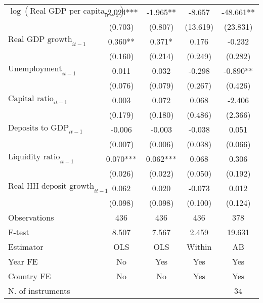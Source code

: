 \begin{longtable}{m{8cm}*{4}{c}}
$\log(\text{Real GDP per capita}_{it-1})$&      -2.024***&      -1.965** &      -8.657   &     -48.661** \\
                    &     (0.703)   &     (0.807)   &    (13.619)   &    (23.831)   \\
$\text{Real GDP growth}_{it-1}$&       0.360** &       0.371*  &       0.176   &      -0.232   \\
                    &     (0.160)   &     (0.214)   &     (0.249)   &     (0.282)   \\
$\text{Unemployment}_{it-1}$&       0.011   &       0.032   &      -0.298   &      -0.890** \\
                    &     (0.076)   &     (0.079)   &     (0.267)   &     (0.426)   \\
$\text{Capital ratio}_{it-1}$&       0.003   &       0.072   &       0.068   &      -2.406   \\
                    &     (0.179)   &     (0.180)   &     (0.486)   &     (2.366)   \\
$\text{Deposits to GDP}_{it-1}$&      -0.006   &      -0.003   &      -0.038   &       0.051   \\
                    &     (0.007)   &     (0.006)   &     (0.038)   &     (0.066)   \\
$\text{Liquidity ratio}_{it-1}$&       0.070***&       0.062***&       0.068   &       0.306   \\
                    &     (0.026)   &     (0.022)   &     (0.050)   &     (0.192)   \\
$\text{Real HH deposit growth}_{it-1}$&       0.062   &       0.020   &      -0.073   &       0.012   \\
                    &     (0.098)   &     (0.098)   &     (0.100)   &     (0.124)   \\
\midrule
Observations        &         436   &         436   &         436   &         378   \\
F-test              &       8.507   &       7.567   &       2.459   &      19.631   \\
Estimator           &         OLS   &         OLS   &      Within   &          AB   \\
Year FE             &          No   &         Yes   &         Yes   &         Yes   \\
Country FE          &          No   &          No   &         Yes   &         Yes   \\
N. of instruments   &               &               &               &          34   \\

\end{longtable}
